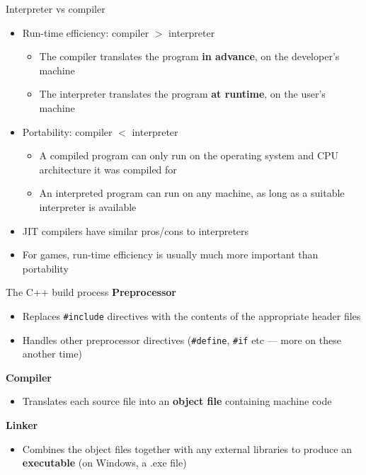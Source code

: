 \begin{frame}{Interpreter vs compiler}
    \begin{itemize}
        \item Run-time efficiency: compiler $>$ interpreter \pause
        \begin{itemize}
            \item The compiler translates the program \textbf{in advance}, on the developer's machine \pause
            \item The interpreter translates the program \textbf{at runtime}, on the user's machine \pause
        \end{itemize}
        \item Portability: compiler $<$ interpreter \pause
        \begin{itemize}
            \item A compiled program can only run on the operating system and CPU architecture it was compiled for \pause
            \item An interpreted program can run on any machine, as long as a suitable interpreter is available \pause
        \end{itemize}
        \item JIT compilers have similar pros/cons to interpreters \pause
        \item For games, run-time efficiency is usually much more important than portability
    \end{itemize}
\end{frame}

\begin{frame}[fragile]{The C++ build process}
    \textbf{Preprocessor} \pause
    \begin{itemize}
        \item Replaces \lstinline{#include} directives with the contents of the appropriate header files \pause
        \item Handles other preprocessor directives (\lstinline{#define}, \lstinline{#if} etc --- more on these another time) \pause
    \end{itemize}
    \textbf{Compiler} \pause
    \begin{itemize}
        \item Translates each source file into an \textbf{object file} containing machine code \pause
    \end{itemize}
    \textbf{Linker} \pause
    \begin{itemize}
        \item Combines the object files together with any external libraries to produce an \textbf{executable}
            (on Windows, a .exe file)
    \end{itemize}
\end{frame}

